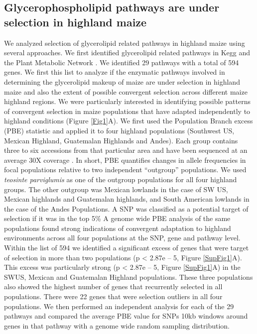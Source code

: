 \documentclass[9pt,twocolumn,twoside,lineno]{gsajnl}
\begin{document}
\subsection{Glycerophospholipid pathways are under selection in  highland maize} 
We analyzed selection of glycerolipid related pathways in highland maize using several approaches. 
We first identified glycerolipid related pathways in Kegg and the Plant Metabolic Network \cite{Schlapfer2017-yl}. We identified 29 pathways with a total of 594 genes. 
We first this list to analyze if the enzymatic pathways involved in determining the glycerolipid makeup of maize are under selection in highland maize and also the extent of possible convergent selection across different maize highland regions. 
We were particularly interested in identifying possible patterns of convergent selection in maize populations that have adapted independently to highland conditions (Figure \ref{Fig1}A).  
We first used the Population Branch excess (PBE) statistic \cite{Pool2017-oa} and applied it to four highland populations (Southwest US, Mexican Highland, Guatemalan Highlands and Andes). 
Each group contains three to six accessions from that particular area and have been sequenced at an average 30X coverage \cite{Wang2017-bc}. 
In short, PBE quantifies changes in allele frequencies in focal populations relative to two independent “outgroup” populations. We used \textit{teosinte parviglumis} as one of the outgroup populations for all four highland groups. 
The other outgroup was Mexican lowlands in the case of SW US, Mexican highlands and Guatemalan highlands, and South American lowlands in the case of the Andes Populations. A SNP was classified as a potential target of selection if it was in the top 5\% 
A genome wide PBE analysis of the same populations \cite{Wang2017-bc} found strong indications of convergent adaptation to highland environments across all four populations at the SNP, gene and pathway level.
Within the list of 594 we identified a significant excess of genes that were target of selection in more than two populations (p < 2.87e – 5, Figure \ref{SupFig1}A). This excess was particularly strong (p < 2.87e – 5, Figure \ref{SupFig1}A) in the SWUS, Mexican and Guatemalan Highland populations. 
These three populations also showed the highest number of genes that recurrently selected in all populations. There were 22 genes that were selection outliers in all four populations. 
We then performed an independent analysis for each of the 29 pathways and compared the average PBE value for SNPs 10kb windows around genes in that pathway with a genome wide random sampling distribution. 
\end{document}
